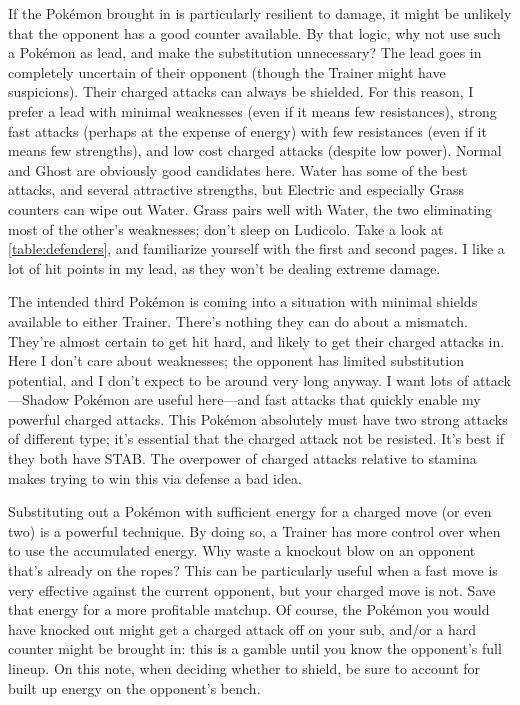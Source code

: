If the Pokémon brought in is particularly resilient to damage, it might be unlikely that
 the opponent has a good counter available.
By that logic, why not use such a Pokémon as lead, and make the substitution unnecessary?
The lead goes in completely uncertain of their opponent (though the Trainer might have suspicions).
Their charged attacks can always be shielded.
For this reason, I prefer a lead with minimal weaknesses (even if it means few resistances),
 strong fast attacks (perhaps at the expense of energy) with few resistances (even if it means
 few strengths), and low cost charged attacks (despite low power). 
Normal and Ghost are obviously good candidates here.
Water has some of the best attacks, and several attractive strengths, but Electric and
 especially Grass counters can wipe out Water.
Grass pairs well with Water, the two eliminating most of the other's weaknesses;
 don't sleep on Ludicolo.
Take a look at \autoref{table:defenders}, and familiarize yourself with the first
 and second pages.
I like a lot of hit points in my lead, as they won't be dealing extreme damage.

The intended third Pokémon is coming into a situation with minimal shields available
 to either Trainer.
There's nothing they can do about a mismatch.
They're almost certain to get hit hard, and likely to get their charged attacks in.
Here I don't care about weaknesses; the opponent has limited substitution potential,
 and I don't expect to be around very long anyway.
I want lots of attack---Shadow Pokémon are useful here---and fast attacks that quickly enable my powerful charged attacks.
This Pokémon absolutely must have two strong attacks of different type; it's essential that the charged attack not be resisted.
It's best if they both have STAB\@.
The overpower of charged attacks relative to stamina makes trying to win this via defense a bad idea.

Substituting out a Pokémon with sufficient energy for a charged move (or even two) is a powerful technique.
By doing so, a Trainer has more control over when to use the accumulated energy.
Why waste a knockout blow on an opponent that's already on the ropes?
This can be particularly useful when a fast move is very effective against the current opponent,
 but your charged move is not.
Save that energy for a more profitable matchup.
Of course, the Pokémon you would have knocked out might get a charged attack off on your sub,
 and/or a hard counter might be brought in:
 this is a gamble until you know the opponent's full lineup.
On this note, when deciding whether to shield, be sure to account for built up energy on the opponent's bench.
